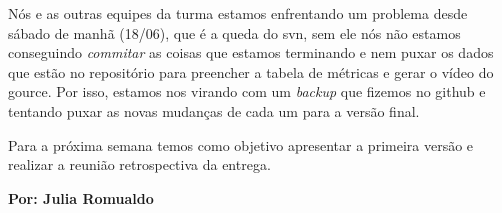 Nós e as outras equipes da turma estamos enfrentando um problema desde sábado de manhã (18/06), que é a queda do \gls{svn}, sem ele nós não estamos conseguindo \textit{commitar} as coisas que estamos terminando e nem puxar os dados que estão no repositório para preencher a tabela de métricas e gerar o vídeo do \gls{gource}. Por isso, estamos nos virando com um \textit{backup} que fizemos no \gls{github} e tentando puxar as novas mudanças de cada um para a versão final.

Para a próxima semana temos como objetivo apresentar a primeira versão e realizar a reunião retrospectiva da entrega. 

\textbf{Por: Julia Romualdo}